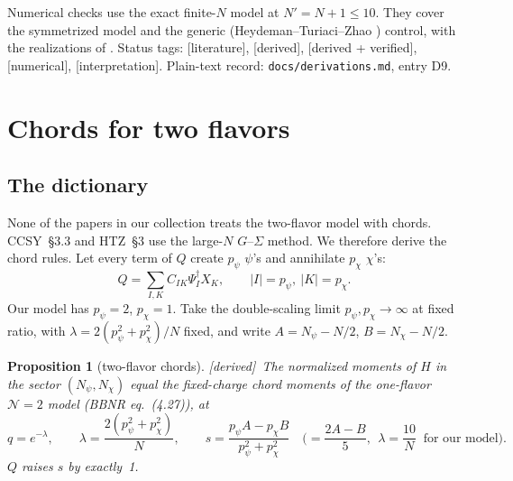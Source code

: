 \documentclass[11pt]{article}
\newcommand{\Np}{N'}
\newcommand{\tagbox}[2]{\textsf{\small\color{#1}[#2]}}
\newcommand{\EST}{\tagbox{cest}{literature}}
\newcommand{\DER}{\tagbox{cder}{derived}}
\newcommand{\VER}{\tagbox{cder}{derived + verified}}
\newcommand{\NUM}{\tagbox{cnum}{numerical}}
\newcommand{\INTERP}{\tagbox{cconj}{interpretation}}
\theoremstyle{plain}
\newtheorem{proposition}{Proposition}
\theoremstyle{remark}
\numberwithin{equation}{section}
\begin{document}
Numerical checks use the exact finite-$N$ model at $\Np=N+1\le10$. They cover the symmetrized model and the generic
(Heydeman--Turiaci--Zhao \cite{HTZ}) control, with the realizations of \cite{prog1023}. Status tags: \EST, \DER,
\VER, \NUM, \INTERP. Plain-text record: \texttt{docs/derivations.md}, entry D9.

\section{Chords for two flavors}\label{sec:chords}

\subsection{The dictionary}

None of the papers in our collection treats the two-flavor model with chords. CCSY~\S3.3 and HTZ~\S3 use the large-$N$
$G$--$\Sigma$ method. We therefore derive the chord rules. Let every term of $Q$ create $p_\psi$ $\psi$'s and annihilate
$p_\chi$ $\chi$'s:
\[
Q=\sum_{I,K}C_{IK}\Psi_I^\dagger X_K,\qquad |I|=p_\psi,\ |K|=p_\chi .
\]
Our model has $p_\psi=2$, $p_\chi=1$. Take the double-scaling limit $p_\psi,p_\chi\to\infty$ at fixed ratio, with
$\lambda=2(p_\psi^2+p_\chi^2)/N$ fixed, and write $A=N_\psi-N/2$, $B=N_\chi-N/2$.

\begin{proposition}[two-flavor chords]\label{prop:dict}\DER\
The normalized moments of $H$ in the sector $(N_\psi,N_\chi)$ equal the fixed-charge chord moments of the one-flavor
$\mathcal N=2$ model (BBNR \cite{BBNR} eq.~(4.27)), at
\begin{equation}\label{eq:dict}
q=e^{-\lambda},\qquad \lambda=\frac{2(p_\psi^2+p_\chi^2)}{N},\qquad
s=\frac{p_\psi A-p_\chi B}{p_\psi^2+p_\chi^2}\quad\Big(=\frac{2A-B}{5},\ \ \lambda=\frac{10}N\ \text{ for our model}\Big).
\end{equation}
$Q$ raises $s$ by exactly~1.
\end{proposition}
\end{document}
